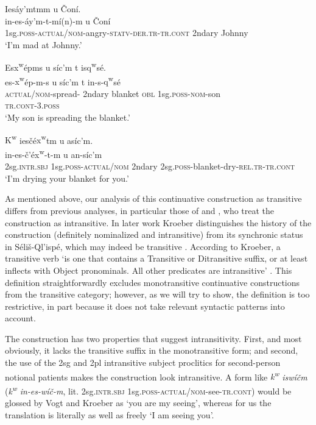 \documentclass[output=paper,colorlinks,citecolor=brown]{langscibook}
\begin{document}
\ea 
\label{ex-thomason-27}
Ies\textrevglotstop\'ay'mtmm {\textltilde}u \v{C}on\'i. \\
\gll in-es-\textrevglotstop\'ay'm-t-m\'i(n)-m {\textltilde}u \v{C}on\'i \\ 
1sg.\textsc{poss}-\textsc{actual/nom}-angry-\textsc{statv-der.tr-tr.cont} 2ndary Johnny \\
\glt `I'm mad at Johnny.'
\z

\ea 
\label{ex-thomason-28}
Es{x\textsuperscript w}\'epms {\textltilde}u s\'ic'm t is{q\textsuperscript w}s\'e{\textglotstop}. \\
 \gll es-{x\textsuperscript w}\'ep-m-s {\textltilde}u s\'ic'm t
   in-s-{q\textsuperscript w}s\'e{\textglotstop} \\
\textsc{actual/nom}-spread- 2ndary
blanket \textsc{obl} 1sg.\textsc{poss}-\textsc{nom}-son\\
\textsc{tr.cont}-3.\textsc{poss} \\
 \glt `My son is spreading the blanket.'
\z

\ea 
\label{ex-thomason-29}
{K\textsuperscript w} ies\v{c}\'e{x\textsuperscript w}{\textltilde}tm {\textltilde}u as\'ic'm. \\
    in-es-\v{c}'\'e{x\textsuperscript
 w}-{\textltilde}t-m {\textltilde}u an-s\'ic'm \\
2sg.\textsc{intr.sbj} 1sg.\textsc{poss}-\textsc{actual/nom} 2ndary 2sg.\textsc{poss}-blanket-dry-\textsc{rel.tr-tr.cont} \\
   \glt `I'm drying your blanket for you.'
\z

As mentioned above, our analysis of this continuative construction as
transitive differs from previous analyses, in particular those of
\citet{Kroeber:1991} and \citet{Vogt:1940}, who treat the construction
as intransitive.  In later work Kroeber distinguishes the history of
the construction (definitely nominalized and intransitive) from its
synchronic status in S\'eli\v{s}-Ql'isp\'e, which may indeed be
transitive \citep[357]{Kroeber:1999}.  According to Kroeber, a transitive verb `is
one that contains a Transitive or Ditransitive suffix, or at least
inflects with Object pronominals.  All other predicates are
intransitive' \citep[29]{Kroeber:1991}.  This definition straightforwardly excludes
monotransitive continuative constructions from the transitive
category; however, as we will try to show, the definition is too
restrictive, in part because it does not take relevant syntactic
patterns into account.


The construction has two properties that suggest intransitivity.
First, and most obviously, it lacks the transitive suffix in the
monotransitive form; and second, the use of the 2sg and 2pl
intransitive subject proclitics for second-person notional patients
makes the construction look intransitive.  A form like
\emph{{k\textsuperscript w} isw\'i\v{c}m} (\emph{{k\textsuperscript w}
in-es-w\'i\v{c}-m}, lit. 2sg.\textsc{intr.sbj} 1sg.\textsc{poss}-\textsc{actual/nom}-see-\textsc{tr.cont}) would be glossed by Vogt and
Kroeber as `you are my seeing', whereas for us the translation is
literally as well as freely `I am seeing you'.
\end{document}
